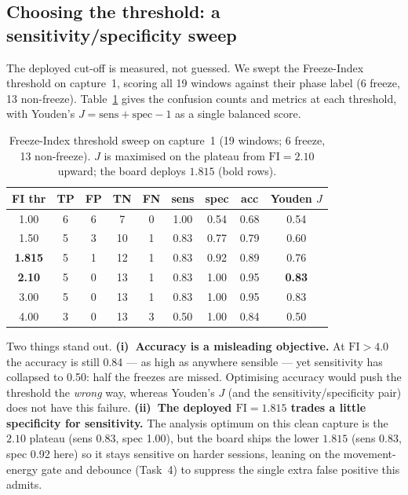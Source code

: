 \documentclass[11pt,a4paper]{article}
\begin{document}
\subsection{Choosing the threshold: a sensitivity/specificity sweep}
The deployed cut-off is measured, not guessed. We swept the Freeze-Index threshold on
capture~1, scoring all 19 windows against their phase label (6 freeze, 13 non-freeze).
Table~\ref{tab:sweep} gives the confusion counts and metrics at each threshold, with
Youden's $J=\mathrm{sens}+\mathrm{spec}-1$ as a single balanced score.

\begin{table}[H]
\centering
\caption{Freeze-Index threshold sweep on capture~1 (19 windows; 6 freeze, 13
non-freeze). $J$ is maximised on the plateau from $\mathrm{FI}=2.10$ upward; the board
deploys $1.815$ (bold rows).}
\label{tab:sweep}
\small
\begin{tabular}{@{}c c c c c c c c c@{}}
\toprule
\textbf{FI thr} & \textbf{TP} & \textbf{FP} & \textbf{TN} & \textbf{FN}
 & \textbf{sens} & \textbf{spec} & \textbf{acc} & \textbf{Youden $J$}\\
\midrule
1.00          & 6 & 6 & 7  & 0 & 1.00 & 0.54 & 0.68 & 0.54\\
1.50          & 5 & 3 & 10 & 1 & 0.83 & 0.77 & 0.79 & 0.60\\
\textbf{1.815}& 5 & 1 & 12 & 1 & 0.83 & 0.92 & 0.89 & 0.76\\
\textbf{2.10} & 5 & 0 & 13 & 1 & 0.83 & 1.00 & 0.95 & \textbf{0.83}\\
3.00          & 5 & 0 & 13 & 1 & 0.83 & 1.00 & 0.95 & 0.83\\
4.00          & 3 & 0 & 13 & 3 & 0.50 & 1.00 & 0.84 & 0.50\\
\bottomrule
\end{tabular}
\end{table}

Two things stand out. \textbf{(i)~Accuracy is a misleading objective.} At
$\mathrm{FI}>4.0$ the accuracy is still 0.84 --- as high as anywhere sensible --- yet
sensitivity has collapsed to 0.50: half the freezes are missed. Optimising accuracy
would push the threshold the \emph{wrong} way, whereas Youden's $J$ (and the
sensitivity/specificity pair) does not have this failure. \textbf{(ii)~The deployed
$\mathrm{FI}=1.815$ trades a little specificity for sensitivity.} The analysis optimum
on this clean capture is the $2.10$ plateau (sens 0.83, spec 1.00), but the board
ships the lower $1.815$ (sens 0.83, spec 0.92 here) so it stays sensitive on harder
sessions, leaning on the movement-energy gate and debounce (Task~4) to suppress the
single extra false positive this admits.
\end{document}

